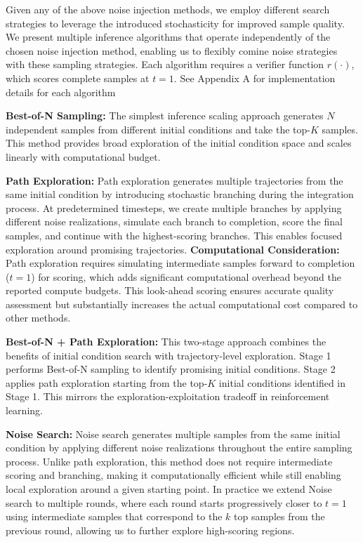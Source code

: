 \documentclass{article}
\begin{document}
Given any of the above noise injection methods, we employ different search strategies to leverage the introduced stochasticity for improved sample quality. We present multiple inference algorithms that operate independently of the chosen noise injection method, enabling us to flexibly comine noise strategies with these sampling strategies. Each algorithm requires a verifier function $r(\cdot)$, which scores complete samples at $t=1$. See Appendix A for implementation details for each algorithm

\textbf{Best-of-N Sampling:} The simplest inference scaling approach generates $N$ independent samples from different initial conditions and take the top-$K$ samples. This method provides broad exploration of the initial condition space and scales linearly with computational budget.

\textbf{Path Exploration:} Path exploration generates multiple trajectories from the same initial condition by introducing stochastic branching during the integration process. At predetermined timesteps, we create multiple branches by applying different noise realizations, simulate each branch to completion, score the final samples, and continue with the highest-scoring branches. This enables focused exploration around promising trajectories. \textbf{Computational Consideration:} Path exploration requires simulating intermediate samples forward to completion ($t=1$) for scoring, which adds significant computational overhead beyond the reported compute budgets. This look-ahead scoring ensures accurate quality assessment but substantially increases the actual computational cost compared to other methods.

\textbf{Best-of-N + Path Exploration:} This two-stage approach combines the benefits of initial condition search with trajectory-level exploration. Stage 1 performs Best-of-N sampling to identify promising initial conditions. Stage 2 applies path exploration starting from the top-$K$ initial conditions identified in Stage 1. This mirrors the exploration-exploitation tradeoff in reinforcement learning.

\textbf{Noise Search:} Noise search generates multiple samples from the same initial condition by applying different noise realizations throughout the entire sampling process. Unlike path exploration, this method does not require intermediate scoring and branching, making it computationally efficient while still enabling local exploration around a given starting point. In practice we extend Noise search to multiple rounds, where each round starts progressively closer to $t=1$ using intermediate samples that correspond to the $k$ top samples from the previous round, allowing us to further explore high-scoring regions.
\end{document}
